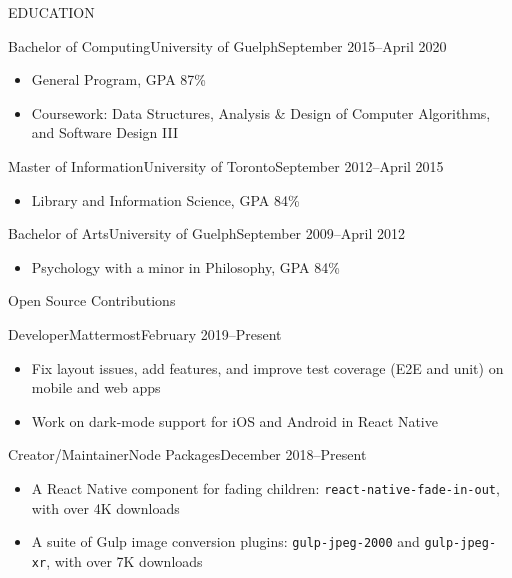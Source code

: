 \documentclass[]{mcdowellcv}
\begin{document}
	\makeheader
	
	\begin{cvsection}{EDUCATION}
		\begin{cvsubsection}{Bachelor of Computing}{University of Guelph}{September 2015--April 2020}
			\begin{itemize}
				\item General Program, GPA 87\%
				\item Coursework: Data Structures, Analysis \& Design of Computer Algorithms, and Software Design III
			\end{itemize}
		\end{cvsubsection}

		\begin{cvsubsection}{Master of Information}{University of Toronto}{September 2012--April 2015}
			\begin{itemize}
				\item Library and Information Science, GPA 84\%
			\end{itemize}
		\end{cvsubsection}

		\begin{cvsubsection}{Bachelor of Arts}{University of Guelph}{September 2009--April 2012}
			\begin{itemize}
				\item Psychology with a minor in Philosophy, GPA 84\%
			\end{itemize}
		\end{cvsubsection}
	\end{cvsection}

	\begin{cvsection}{Open Source Contributions}
		\begin{cvsubsection}{Developer}{Mattermost}{February 2019--Present}
			\begin{itemize}
				\item Fix layout issues, add features, and improve test coverage (E2E and unit) on mobile and web apps
				\item Work on dark-mode support for iOS and Android in React Native
			\end{itemize}
		\end{cvsubsection}

		\begin{cvsubsection}{Creator/Maintainer}{Node Packages}{December 2018--Present}
			\begin{itemize}
				\item A React Native component for fading children: \texttt{react-native-fade-in-out}, with over 4K downloads
				\item A suite of Gulp image conversion plugins: \texttt{gulp-jpeg-2000} and \texttt{gulp-jpeg-xr}, with over 7K downloads
			\end{itemize}
		\end{cvsubsection}
			
	\end{cvsection}
	
\end{document}
